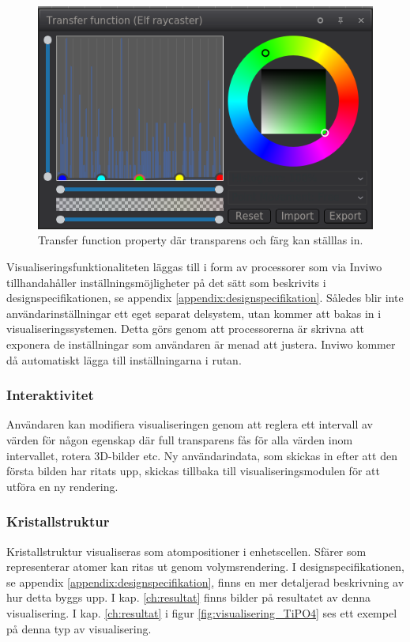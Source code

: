 \documentclass[a4paper,12pt]{article}
\begin{document}
\begin{figure}[H]
	\centering
	\includegraphics[scale=0.55]{transferfunction_elf.png}
	\caption{Transfer function property där transparens och färg kan ställlas in.}
	\label{fig:transferfunction}
\end{figure}

Visualiseringsfunktionaliteten läggas till i form av processorer som via Inviwo tillhandahåller inställningsmöjligheter på det sätt som beskrivits i designspecifikationen, se appendix \ref{appendix:designspecifikation}. Således blir inte användarinställningar ett eget separat delsystem, utan kommer att bakas in i visualiseringssystemen. Detta görs genom att processorerna är skrivna att exponera de inställningar som användaren är menad att
justera. Inviwo kommer då automatiskt lägga till inställningarna i rutan.

\subsubsection{Interaktivitet}
Användaren kan modifiera visualiseringen genom att reglera ett intervall av värden för
någon egenskap där full transparens fås för alla värden inom intervallet, rotera 3D-bilder etc.
Ny användarindata, som skickas in efter att den första bilden har ritats upp, skickas tillbaka till
visualiseringsmodulen för att utföra en ny rendering. 

\subsubsection{Kristallstruktur}
Kristallstruktur visualiseras som atompositioner i enhetscellen. Sfärer som representerar atomer  kan  ritas  ut  genom  volymsrendering. %
I designspecifikationen, se appendix \ref{appendix:designspecifikation}, finns en mer detaljerad beskrivning av
hur detta byggs upp. I kap. \ref{ch:resultat} finns bilder på resultatet av denna visualisering. I kap. \ref{ch:resultat} i figur \ref{fig:visualisering_TiPO4} ses ett exempel på denna typ av visualisering.
\end{document}
